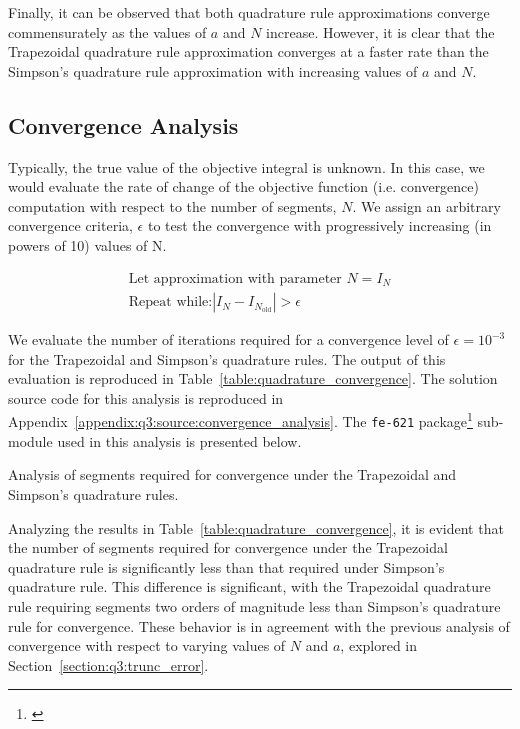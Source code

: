 \documentclass[10pt]{article}
\begin{document}
    Finally, it can be observed that both quadrature rule approximations converge commensurately as the values of $a$ and $N$ increase. However, it is clear that the Trapezoidal quadrature rule approximation converges at a faster rate than the Simpson's quadrature rule approximation with increasing values of $a$ and $N$.


    \subsection{Convergence Analysis} 

    Typically, the true value of the objective integral is unknown. In this case, we would evaluate the rate of change of the objective function (i.e. convergence) computation with respect to the number of segments, $N$. We assign an arbitrary convergence criteria, $\epsilon$ to test the convergence with progressively increasing (in powers of 10) values of N.

    \begin{gather*}
        \text{Let approximation with parameter $N$} = I_N \\
        \text{Repeat while:} \left| I_N - I_{N_\text{old}} \right| > \epsilon
    \end{gather*}

    We evaluate the number of iterations required for a convergence level of $\epsilon = 10^{-3}$ for the Trapezoidal and Simpson's quadrature rules. The output of this evaluation is reproduced in Table~\ref{table:quadrature_convergence}. The solution source code for this analysis is reproduced in Appendix~\ref{appendix:q3:source:convergence_analysis}. The \texttt{fe-621} package\footnote{\cite{Weerawarana2019}} sub-module used in this analysis is presented below.

    

    \begin{table}[h]
        \centering
        \caption{Analysis of segments required for convergence under the Trapezoidal and Simpson's quadrature rules.}
        \label{table:quadrature_convergence}
    \end{table}

    Analyzing the results in Table~\ref{table:quadrature_convergence}, it is evident that the number of segments required for convergence under the Trapezoidal quadrature rule is significantly less than that required under Simpson's quadrature rule. This difference is significant, with the Trapezoidal quadrature rule requiring segments two orders of magnitude less than Simpson's quadrature rule for convergence. These behavior is in agreement with the previous analysis of convergence with respect to varying values of $N$ and $a$, explored in Section~\ref{section:q3:trunc_error}.
\end{document}
